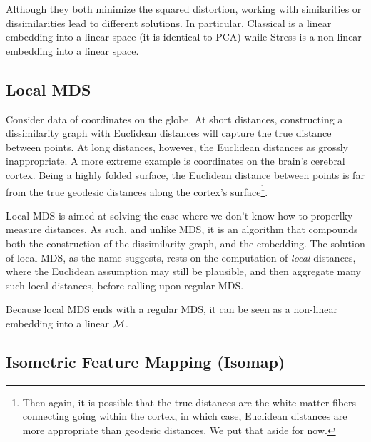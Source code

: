\documentclass[12pt,a4paper]{article}
\begin{document}
\begin{remark}
	Although they both minimize the squared distortion, working with similarities or dissimilarities lead to different solutions. 
	In particular, Classical is a linear embedding into a linear space (it is identical to PCA) while Stress is a non-linear embedding into a linear space. 
\end{remark}




\subsection{Local MDS}
\label{sec:localMDS}

\begin{example}
\label{ex:non-euclidean}
	Consider data of coordinates on the globe. 
	At short distances, constructing a dissimilarity graph with Euclidean distances will capture the true distance between points. 
	At long distances, however, the Euclidean distances as grossly inappropriate. 
	A more extreme example is coordinates on the brain's cerebral cortex.
	Being a highly folded surface, the Euclidean distance between points is far from the true geodesic distances along the cortex's surface\footnote{Then again, it is possible that the true distances are the white matter fibers connecting going within the cortex, in which case, Euclidean distances are more appropriate than geodesic distances. We put that aside for now.}.
\end{example}

Local MDS is aimed at solving the case where we don't know how to properlky measure distances. 
As such, and unlike MDS, it is an algorithm that compounds both the construction of the dissimilarity graph, and the embedding. 
The solution of local MDS, as the name suggests, rests on the computation of \emph{local} distances, where the Euclidean assumption may still be plausible, and then aggregate many such local distances, before calling upon regular MDS.

Because local MDS ends with a regular MDS, it can be seen as a non-linear embedding into a linear $\mathcal{M}$.





\subsection{Isometric Feature Mapping (Isomap)}
\label{sec:isomap}
\end{document}
